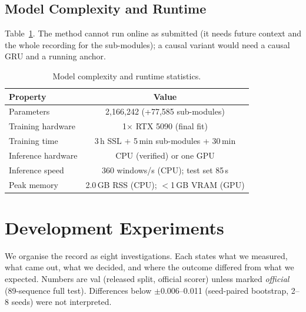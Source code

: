\documentclass[letterpaper,10pt,conference]{ieeeconf}
\begin{document}
\subsection{Model Complexity and Runtime}
Table~\ref{tab:runtime}. The method cannot run online as submitted (it needs future context and the
whole recording for the sub-modules); a causal variant would need a causal GRU and a running
anchor.

\begin{table}[htbp]
\centering\footnotesize
\caption{Model complexity and runtime statistics.}
\begin{tabular}{lc}
\toprule
Property & Value \\
\midrule
Parameters & 2,166,242 (+77,585 sub-modules) \\
Training hardware & 1$\times$ RTX 5090 (final fit) \\
Training time & 3\,h SSL + 5\,min sub-modules + 30\,min \\
Inference hardware & CPU (verified) or one GPU \\
Inference speed & 360 windows/s (CPU); test set 85\,s \\
Peak memory & 2.0\,GB RSS (CPU); $<$1\,GB VRAM (GPU) \\
\bottomrule
\end{tabular}
\label{tab:runtime}
\end{table}

\section{Development Experiments}
\label{sec:devexp}
We organise the record as eight investigations. Each states what we measured, what came out, what
we decided, and where the outcome differed from what we expected. Numbers are val (released
split, official scorer) unless marked \emph{official} (89-sequence full test). Differences below
$\pm$0.006--0.011 (seed-paired bootstrap, 2--8 seeds) were not interpreted.
\end{document}
